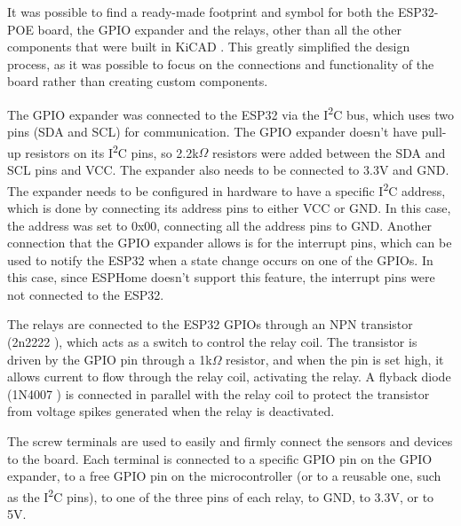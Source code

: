 \documentclass[a4paper,12pt]{article}
\begin{document}
It was possible to find a ready-made footprint and symbol for both the ESP32-POE board, the GPIO expander and the relays, other than all the other components that were built in KiCAD \cite{ESP32POEFootprintSymbol}. This greatly simplified the design process, as it was possible to focus on the connections and functionality of the board rather than creating custom components.

The GPIO expander was connected to the ESP32 via the I\textsuperscript{2}C bus, which uses two pins (SDA and SCL) for communication. The GPIO expander doesn't have pull-up resistors on its I\textsuperscript{2}C pins, so 2.2k$\Omega$ resistors were added between the SDA and SCL pins and VCC.
The expander also needs to be connected to 3.3V and GND.
The expander needs to be configured in hardware to have a specific I\textsuperscript{2}C address, which is done by connecting its address pins to either VCC or GND. In this case, the address was set to 0x00, connecting all the address pins to GND. 
Another connection that the GPIO expander allows is for the interrupt pins, which can be used to notify the ESP32 when a state change occurs on one of the GPIOs. In this case, since ESPHome doesn't support this feature, the interrupt pins were not connected to the ESP32.

The relays are connected to the ESP32 GPIOs through an NPN transistor (2n2222 \cite{PN2222ABU}), which acts as a switch to control the relay coil. The transistor is driven by the GPIO pin through a 1k$\Omega$ resistor, and when the pin is set high, it allows current to flow through the relay coil, activating the relay. A flyback diode (1N4007 \cite{1N4007}) is connected in parallel with the relay coil to protect the transistor from voltage spikes generated when the relay is deactivated.

The screw terminals are used to easily and firmly connect the sensors and devices to the board. Each terminal is connected to a specific GPIO pin on the GPIO expander, to a free GPIO pin on the microcontroller (or to a reusable one, such as the I\textsuperscript{2}C pins), to one of the three pins of each relay, to GND, to 3.3V, or to 5V. 
\end{document}
